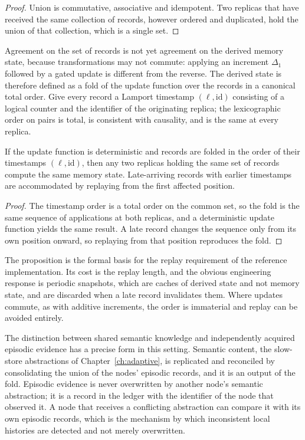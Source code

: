 \begin{proof}
Union is commutative, associative and idempotent. Two replicas that have received the same collection of records, however ordered and duplicated, hold the union of that collection, which is a single set.
\end{proof}

Agreement on the set of records is not yet agreement on the derived memory state, because transformations may not commute: applying an increment $\Delta_1$ followed by a gated update is different from the reverse. The derived state is therefore defined as a fold of the update function over the records in a canonical total order. Give every record a Lamport timestamp \cite{lamport1978} $(\ell,\mathrm{id})$ consisting of a logical counter and the identifier of the originating replica; the lexicographic order on pairs is total, is consistent with causality, and is the same at every replica.

\begin{proposition}\label{prop:derived}
If the update function is deterministic and records are folded in the order of their timestamps $(\ell,\mathrm{id})$, then any two replicas holding the same set of records compute the same memory state. Late-arriving records with earlier timestamps are accommodated by replaying from the first affected position.
\end{proposition}

\begin{proof}
The timestamp order is a total order on the common set, so the fold is the same sequence of applications at both replicas, and a deterministic update function yields the same result. A late record changes the sequence only from its own position onward, so replaying from that position reproduces the fold.
\end{proof}

The proposition is the formal basis for the replay requirement of the reference implementation. Its cost is the replay length, and the obvious engineering response is periodic snapshots, which are caches of derived state and not memory state, and are discarded when a late record invalidates them. Where updates commute, as with additive increments, the order is immaterial and replay can be avoided entirely.

The distinction between shared semantic knowledge and independently acquired episodic evidence has a precise form in this setting. Semantic content, the slow-store abstractions of Chapter~\ref{ch:adaptive}, is replicated and reconciled by consolidating the union of the nodes' episodic records, and it is an output of the fold. Episodic evidence is never overwritten by another node's semantic abstraction; it is a record in the ledger with the identifier of the node that observed it. A node that receives a conflicting abstraction can compare it with its own episodic records, which is the mechanism by which inconsistent local histories are detected and not merely overwritten.

